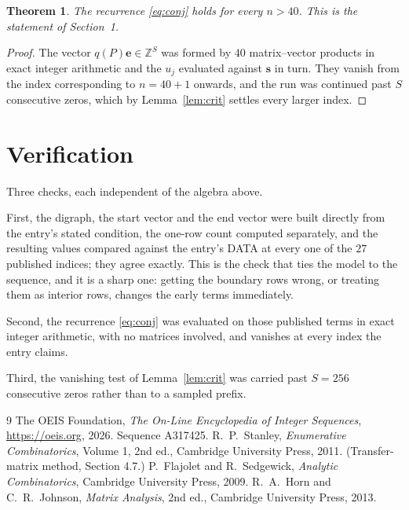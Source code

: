 \documentclass[11pt,a4paper]{article}
\theoremstyle{plain}
\newtheorem{theorem}{Theorem}
\theoremstyle{definition}
\begin{document}
\begin{theorem}
The recurrence \eqref{eq:conj} holds for every $n>40$. This is the statement of
Section~1.
\end{theorem}

\begin{proof}
The vector $q(P)\mathbf{e}\in\mathbb{Z}^{S}$ was formed by $40$ matrix--vector
products in exact integer arithmetic and the $u_j$ evaluated against $\mathbf{s}$ in turn.
They vanish from the index corresponding to $n=40+1$ onwards, and the run was continued
past $S$ consecutive zeros, which by Lemma~\ref{lem:crit} settles every larger index.
\end{proof}

\section{Verification}

Three checks, each independent of the algebra above.

First, the digraph, the start vector and the end vector were built directly from the
entry's stated condition, the one-row count computed separately, and the resulting values
compared against the entry's DATA at every one of the $27$ published indices; they
agree exactly. This is the check that ties the model to the sequence, and it is a sharp one:
getting the boundary rows wrong, or treating them as interior rows, changes the early terms
immediately.

Second, the recurrence \eqref{eq:conj} was evaluated on those published terms in exact
integer arithmetic, with no matrices involved, and vanishes at every index the entry claims.

Third, the vanishing test of Lemma~\ref{lem:crit} was carried past $S=256$ consecutive
zeros rather than to a sampled prefix.

\begin{thebibliography}{9}
 The OEIS Foundation, \emph{The On-Line Encyclopedia of Integer
Sequences}, \url{https://oeis.org}, 2026. Sequence A317425.
 R.~P.~Stanley, \emph{Enumerative Combinatorics}, Volume 1, 2nd ed.,
Cambridge University Press, 2011. (Transfer-matrix method, Section 4.7.)
 P.~Flajolet and R.~Sedgewick, \emph{Analytic Combinatorics}, Cambridge
University Press, 2009.
 R.~A.~Horn and C.~R.~Johnson, \emph{Matrix Analysis}, 2nd ed., Cambridge
University Press, 2013.
\end{thebibliography}
\end{document}
